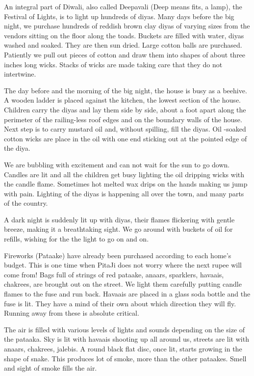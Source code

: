 An integral part of Diwali, also called Deepavali (Deep means fits,
a lamp), the Festival of Lights, is to light up hundreds of diyas.  Many
days before the big night, we purchase hundreds of reddish brown clay
diyas of varying sizes from the vendors sitting on the floor along the
toads. Buckets are filled with water, diyas washed and soaked. They are
then sun dried. Large cotton balls are purchased. Patiently we pull out
pieces of cotton and draw them into shapes of about three inches long
wicks. Stacks of wicks are made taking care that they do not intertwine. 

 The day before and the morning of the big night, the house is busy as
 a beehive. A wooden ladder is placed against the kitchen, the lowest
 section of the house. Children carry the diyas and lay them side by side,
 about a foot apart along the perimeter of the railing-less roof edges and
 on the boundary walls of the house. Next step is to carry mustard oil
 and, without spilling, fill the diyas. Oil -soaked cotton wicks are place
 in the oil with one end sticking out at the pointed edge of the diya.

We are bubbling with excitement and can not wait for the sun to go down.
Candles are lit and all the children get busy lighting the oil dripping
wicks with the candle flame. Sometimes hot melted wax drips on the hands
making us jump with pain. Lighting of the diyas is happening all over the
town, and many parts of the country. 

A dark night is suddenly lit up with diyas, their flames flickering with
gentle breeze, making it a breathtaking sight. We go around with buckets
of oil for refills, wishing for the the light to go on and on. 

Fireworks (Pataake) have already been purchased according to each home's
budget. This is one time when PitaJi does not worry where the next rupee
will come from! Bags full of strings of red pataake, anaars, sparklers,
havaais, chakrees, are brought out on the street. We light them carefully
putting candle flames to the fuse and run back. Havaais are placed in
a glass soda bottle and the fuse is lit. They have a mind of their own
about which direction they will fly. Running away from these is absolute
critical. 

The air is filled with various levels of lights and sounds depending on
the size of the pataaka. Sky is lit with havaais shooting up all around
us, streets are lit with anaars, chakrees, jalebis. A round black flat
disc, once lit, starts growing in the shape of snake. This produces lot of
smoke, more than the other pataakes. Smell and sight of smoke fills the
air.  

